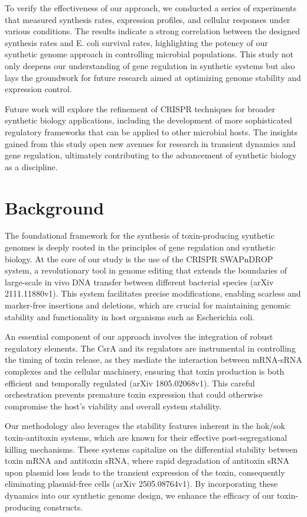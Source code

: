 \documentclass{article}
\begin{document}
To verify the effectiveness of our approach, we conducted a series of experiments that measured synthesis rates, expression profiles, and cellular responses under various conditions. The results indicate a strong correlation between the designed synthesis rates and E. coli survival rates, highlighting the potency of our synthetic genome approach in controlling microbial populations. This study not only deepens our understanding of gene regulation in synthetic systems but also lays the groundwork for future research aimed at optimizing genome stability and expression control.

Future work will explore the refinement of CRISPR techniques for broader synthetic biology applications, including the development of more sophisticated regulatory frameworks that can be applied to other microbial hosts. The insights gained from this study open new avenues for research in transient dynamics and gene regulation, ultimately contributing to the advancement of synthetic biology as a discipline.

\section{Background}
The foundational framework for the synthesis of toxin-producing synthetic genomes is deeply rooted in the principles of gene regulation and synthetic biology. At the core of our study is the use of the CRISPR SWAPnDROP system, a revolutionary tool in genome editing that extends the boundaries of large-scale in vivo DNA transfer between different bacterial species (arXiv 2111.11880v1). This system facilitates precise modifications, enabling scarless and marker-free insertions and deletions, which are crucial for maintaining genomic stability and functionality in host organisms such as Escherichia coli.

An essential component of our approach involves the integration of robust regulatory elements. The CsrA and its regulators are instrumental in controlling the timing of toxin release, as they mediate the interaction between mRNA-sRNA complexes and the cellular machinery, ensuring that toxin production is both efficient and temporally regulated (arXiv 1805.02068v1). This careful orchestration prevents premature toxin expression that could otherwise compromise the host's viability and overall system stability.

Our methodology also leverages the stability features inherent in the hok/sok toxin-antitoxin systems, which are known for their effective post-segregational killing mechanisms. These systems capitalize on the differential stability between toxin mRNA and antitoxin sRNA, where rapid degradation of antitoxin sRNA upon plasmid loss leads to the transient expression of the toxin, consequently eliminating plasmid-free cells (arXiv 2505.08764v1). By incorporating these dynamics into our synthetic genome design, we enhance the efficacy of our toxin-producing constructs.
\end{document}
